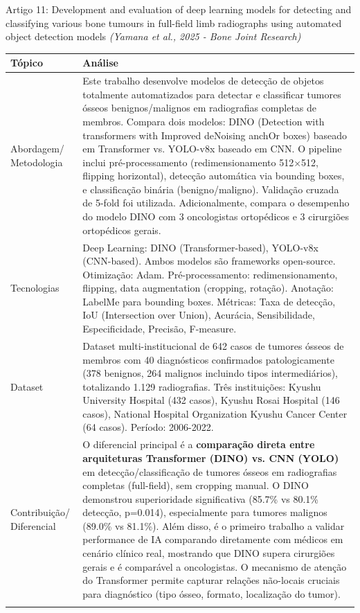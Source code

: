 \documentclass[12pt, a4paper]{article}
\begin{document}
\begin{fichabox}{Artigo 11: Development and evaluation of deep learning models for detecting and classifying various bone tumours in full-field limb radiographs using automated object detection models}
\textit{(Yamana et al., 2025 - Bone Joint Research)}

\begin{longtable}{@{} B L{10.5cm} @{}}
    \toprule
    \textbf{Tópico} & \textbf{Análise} \\
    \midrule
    \endhead

    Abordagem/ Metodologia & Este trabalho desenvolve modelos de detecção de objetos totalmente automatizados para detectar e classificar tumores ósseos benignos/malignos em radiografias completas de membros. Compara dois modelos: DINO (Detection with transformers with Improved deNoising anchOr boxes) baseado em Transformer vs. YOLO-v8x baseado em CNN. O pipeline inclui pré-processamento (redimensionamento 512×512, flipping horizontal), detecção automática via bounding boxes, e classificação binária (benigno/maligno). Validação cruzada de 5-fold foi utilizada. Adicionalmente, compara o desempenho do modelo DINO com 3 oncologistas ortopédicos e 3 cirurgiões ortopédicos gerais. \\
    \addlinespace

    Tecnologias & Deep Learning: DINO (Transformer-based), YOLO-v8x (CNN-based). Ambos modelos são frameworks open-source. Otimização: Adam. Pré-processamento: redimensionamento, flipping, data augmentation (cropping, rotação). Anotação: LabelMe para bounding boxes. Métricas: Taxa de detecção, IoU (Intersection over Union), Acurácia, Sensibilidade, Especificidade, Precisão, F-measure. \\
    \addlinespace

    Dataset & Dataset multi-institucional de 642 casos de tumores ósseos de membros com 40 diagnósticos confirmados patologicamente (378 benignos, 264 malignos incluindo tipos intermediários), totalizando 1.129 radiografias. Três instituições: Kyushu University Hospital (432 casos), Kyushu Rosai Hospital (146 casos), National Hospital Organization Kyushu Cancer Center (64 casos). Período: 2006-2022. \\
    \addlinespace

    Contribuição/ Diferencial & O diferencial principal é a \textbf{comparação direta entre arquiteturas Transformer (DINO) vs. CNN (YOLO)} em detecção/classificação de tumores ósseos em radiografias completas (full-field), sem cropping manual. O DINO demonstrou superioridade significativa (85.7\% vs 80.1\% detecção, p=0.014), especialmente para tumores malignos (89.0\% vs 81.1\%). Além disso, é o primeiro trabalho a validar performance de IA comparando diretamente com médicos em cenário clínico real, mostrando que DINO supera cirurgiões gerais e é comparável a oncologistas. O mecanismo de atenção do Transformer permite capturar relações não-locais cruciais para diagnóstico (tipo ósseo, formato, localização do tumor). \\
    \addlinespace


\end{longtable}
\end{fichabox}
\end{document}
